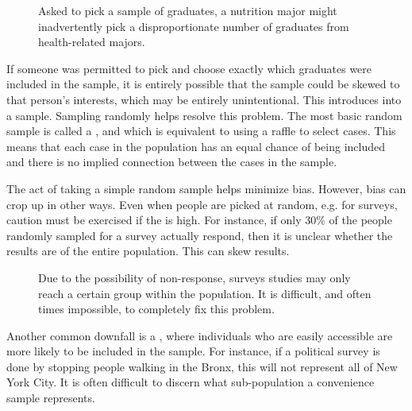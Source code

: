\begin{figure}
  \centering
  \caption{Asked to pick a sample of graduates,
      a nutrition major might inadvertently pick a
      disproportionate number of graduates from
      health-related majors.}
  \label{popToSubSampleGraduates}
\end{figure}

If someone was permitted to pick and choose exactly which
graduates were included in the sample, it is entirely possible
that the sample could be skewed to that person's interests,
which may be entirely unintentional.
This introduces  into a sample.
Sampling randomly helps resolve this problem.
The most basic random sample is called a
, and which is equivalent to using
a raffle to select cases.
This means that each case in the population has an equal chance
of being included and there is no implied connection between
the cases in the sample.

The act of taking a simple random sample helps minimize bias.
However, bias can crop up in other ways.
Even when people are picked at random, e.g. for surveys,
caution must be exercised if the
 is high.
For instance, if only 30\% of the people randomly sampled
for a survey actually respond, then it is unclear whether
the results are  of the entire population.
This 
 can skew results.

\begin{figure}[h]
  \centering
  \caption{Due to the possibility of non-response,
      surveys studies may only reach a certain group
      within the population.
      It is difficult, and often times impossible,
      to completely fix this problem.}
  \label{surveySample}
\end{figure}

Another common downfall is a
,
where individuals who are easily accessible are more likely
to be included in the sample.
For instance, if a political survey is done by stopping people
walking in the Bronx, this will not represent all of New York City.
It is often difficult to discern what sub-population a convenience
sample represents.

